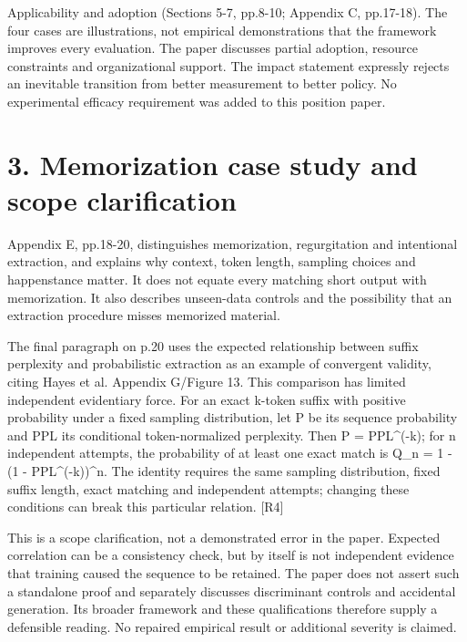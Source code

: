 \documentclass[10pt]{article}
\begin{document}
Applicability and adoption (Sections 5-7, pp.8-10; Appendix C, pp.17-18). The four cases are illustrations, not empirical demonstrations that the framework improves every evaluation. The paper discusses partial adoption, resource constraints and organizational support. The impact statement expressly rejects an inevitable transition from better measurement to better policy. No experimental efficacy requirement was added to this position paper.\par
\section*{3. Memorization case study and scope clarification}
Appendix E, pp.18-20, distinguishes memorization, regurgitation and intentional extraction, and explains why context, token length, sampling choices and happenstance matter. It does not equate every matching short output with memorization. It also describes unseen-data controls and the possibility that an extraction procedure misses memorized material.\par
The final paragraph on p.20 uses the expected relationship between suffix perplexity and probabilistic extraction as an example of convergent validity, citing Hayes et al. Appendix G/Figure 13. This comparison has limited independent evidentiary force. For an exact k-token suffix with positive probability under a fixed sampling distribution, let P be its sequence probability and PPL its conditional token-normalized perplexity. Then P = PPL\textasciicircum{}(-k); for n independent attempts, the probability of at least one exact match is Q\_n = 1 - (1 - PPL\textasciicircum{}(-k))\textasciicircum{}n. The identity requires the same sampling distribution, fixed suffix length, exact matching and independent attempts; changing these conditions can break this particular relation. [R4]\par
This is a scope clarification, not a demonstrated error in the paper. Expected correlation can be a consistency check, but by itself is not independent evidence that training caused the sequence to be retained. The paper does not assert such a standalone proof and separately discusses discriminant controls and accidental generation. Its broader framework and these qualifications therefore supply a defensible reading. No repaired empirical result or additional severity is claimed.\par
\end{document}
